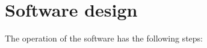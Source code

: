\documentclass[a4paper,10pt]{article}
\begin{document}
%
%
%
%

\section{Software design}
\label{sec:design}

The operation of the software has the following steps:
\end{document}
